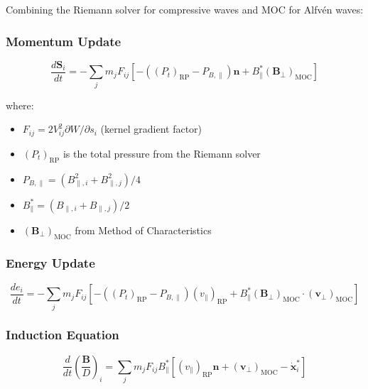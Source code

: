 \documentclass[12pt,a4paper]{article}
\begin{document}
Combining the Riemann solver for compressive waves and MOC for Alfv\'en waves:

\subsubsection{Momentum Update}

\begin{equation}
\boxed{
\frac{d\bm{S}_i}{dt} = -\sum_j m_j F_{ij}
\left[-\left((P_t)_\text{RP} - P_{B,\parallel}\right)\bm{n} + B_\parallel^* (\bm{B}_\perp)_\text{MOC}\right]
}
\label{eq:final_momentum}
\end{equation}

where:
\begin{itemize}
    \item $F_{ij} = 2 V_{ij}^2 \partial W / \partial s_i$ (kernel gradient factor)
    \item $(P_t)_\text{RP}$ is the total pressure from the Riemann solver
    \item $P_{B,\parallel} = (B_{\parallel,i}^2 + B_{\parallel,j}^2)/4$
    \item $B_\parallel^* = (B_{\parallel,i} + B_{\parallel,j})/2$
    \item $(\bm{B}_\perp)_\text{MOC}$ from Method of Characteristics
\end{itemize}

\subsubsection{Energy Update}

\begin{equation}
\boxed{
\frac{de_i}{dt} = -\sum_j m_j F_{ij}
\left[-\left((P_t)_\text{RP} - P_{B,\parallel}\right)(v_\parallel)_\text{RP}
+ B_\parallel^* (\bm{B}_\perp)_\text{MOC} \cdot (\bm{v}_\perp)_\text{MOC}\right]
}
\label{eq:final_energy}
\end{equation}

\subsubsection{Induction Equation}

\begin{equation}
\boxed{
\frac{d}{dt}\left(\frac{\bm{B}}{D}\right)_i = \sum_j m_j F_{ij} B_\parallel^*
\left[(v_\parallel)_\text{RP} \bm{n} + (\bm{v}_\perp)_\text{MOC} - \dot{\bm{x}}_i^*\right]
}
\label{eq:final_induction}
\end{equation}
\end{document}
